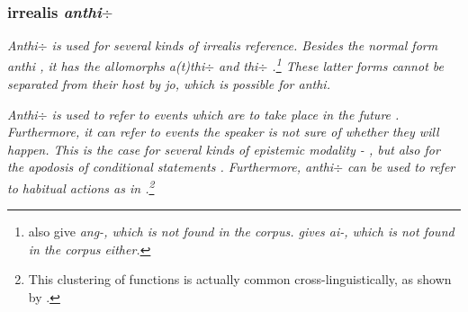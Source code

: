 \subsubsection{irrealis \em anthi$\div$\em}\label{sec:morph:anthi-}
\em Anthi$\div$ \em is used for several kinds of irrealis reference. Besides the normal form \em anthi \em {}, it has the allomorphs  \em a(t)thi$\div$ \em and  \em thi$\div$ \em {} \citep[cf.][31]{Adelaar1991}.\footnote{\citet[168]{SmithEtAl2006cll} also give \em ang-\em, which is not found in the corpus. \citet{Ansaldo2009book} gives \em ai-\em, which is not found in the corpus either.} These latter forms cannot be separated from their host by \em jo\em, which is possible for \em anthi\em.




 




\em Anthi$\div$ \em is used to refer to events which are to take place in the future  . Furthermore, it can refer to events the speaker is not sure of whether they will happen. This is the case for several kinds of epistemic modality - , 
but also for the apodosis  of conditional statements .
Furthermore, \em anthi$\div$ \em can be used to refer to habitual actions as in  .\footnote{This clustering of functions is actually common cross-linguistically, as shown by \citet{Givon1994sil}.}
 

